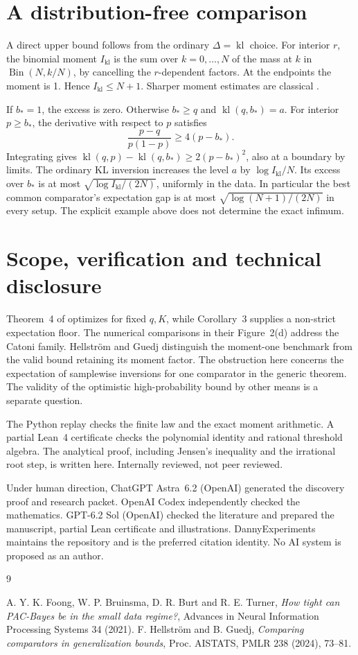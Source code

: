 \documentclass[11pt]{amsart}
\newcommand{\kl}{\operatorname{kl}}
\newcommand{\Bin}{\operatorname{Bin}}
\begin{document}
\section{A distribution-free comparison}
A direct upper bound follows from the ordinary \(\Delta=\kl\)
choice. For interior \(r\), the binomial moment \(I_{\kl}\)
is the sum over \(k=0,\ldots,N\) of the mass at \(k\) in
\(\Bin(N,k/N)\), by cancelling the \(r\)-dependent factors.
At the endpoints the moment is 1. Hence \(I_{\kl}\le N+1\).
Sharper moment estimates are classical \cite[Corollary~2]{foong}.

If \(b_*=1\), the excess is zero. Otherwise \(b_*\ge q\) and
\(\kl(q,b_*)=a\). For interior \(p\ge b_*\), the derivative with
respect to \(p\) satisfies
\[
      \frac{p-q}{p(1-p)}\ge 4(p-b_*).
\]
Integrating gives \(\kl(q,p)-\kl(q,b_*)\ge2(p-b_*)^2\), also
at a boundary by limits. The ordinary KL inversion increases the
level \(a\) by \(\log I_{\kl}/N\). Its excess over \(b_*\) is at most
\(\sqrt{\log I_{\kl}/(2N)}\), uniformly in the data. In particular
the best common comparator's expectation gap is at most
\(\sqrt{\log(N+1)/(2N)}\) in every setup. The explicit example
above does not determine the exact infimum.

\section*{Scope, verification and technical disclosure}
Theorem~4 of \cite{foong} optimizes for fixed \(q,K\), while
Corollary~3 supplies a non-strict expectation floor. The
numerical comparisons in their Figure~2(d) address the Catoni
family. Hellstr\"om and Guedj \cite[Theorem~8]{hg} distinguish
the moment-one benchmark from the valid bound retaining its
moment factor. The obstruction here concerns the expectation
of samplewise inversions for one comparator in the generic
theorem. The validity of the optimistic high-probability bound
by other means is a separate question.

The Python replay checks the finite law and the exact moment
arithmetic. A partial Lean~4 certificate checks the polynomial
identity and rational threshold algebra. The analytical proof,
including Jensen's inequality and the irrational root step,
is written here. Internally reviewed, not peer reviewed.

Under human direction, ChatGPT Astra~6.2 (OpenAI) generated the
discovery proof and research packet. OpenAI Codex independently
checked the mathematics. GPT-6.2 Sol (OpenAI) checked the
literature and prepared the manuscript, partial Lean certificate
and illustrations. DannyExperiments maintains the repository
and is the preferred citation identity. No AI system is proposed
as an author.

\begin{thebibliography}{9}
\raggedright
{} A. Y. K. Foong, W. P. Bruinsma, D. R. Burt and R. E. Turner,
\emph{How tight can PAC-Bayes be in the small data regime?},
Advances in Neural Information Processing Systems 34 (2021).
 F. Hellstr\"om and B. Guedj,
\emph{Comparing comparators in generalization bounds},
Proc. AISTATS, PMLR 238 (2024), 73--81.
\end{thebibliography}
\end{document}
